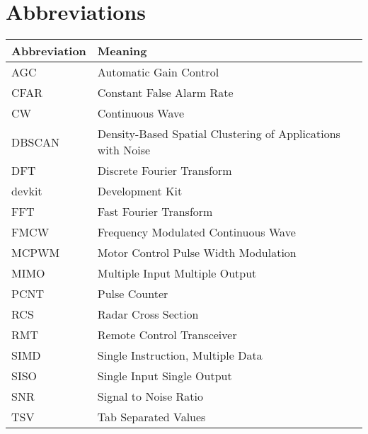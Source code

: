 
\chapter*{Abbreviations}


\begin{center}
  \begin{tabular}{| m{4cm}| m{9cm} | }
    \hline
    \textbf{Abbreviation} & \textbf{Meaning}                                            \\
    \hline
    \hline
    AGC                   & Automatic Gain Control                                      \\
    CFAR                  & Constant False Alarm Rate                                   \\
    CW                    & Continuous Wave                                             \\
    DBSCAN                & Density-Based Spatial Clustering of Applications with Noise \\
    DFT                   & Discrete Fourier Transform                                  \\
    devkit                & Development Kit                                             \\
    FFT                   & Fast Fourier Transform                                      \\
    FMCW                  & Frequency Modulated Continuous Wave                         \\
    MCPWM                 & Motor Control Pulse Width Modulation                        \\
    MIMO                  & Multiple Input Multiple Output                              \\
    PCNT                  & Pulse Counter                                               \\
    RCS                   & Radar Cross Section                                         \\
    RMT                   & Remote Control Transceiver                                  \\
    SIMD                  & Single Instruction, Multiple Data                           \\
    SISO                  & Single Input Single Output                                  \\
    SNR                   & Signal to Noise Ratio                                       \\
    TSV                   & Tab Separated Values                                        \\
    \hline
  \end{tabular}

\end{center}
